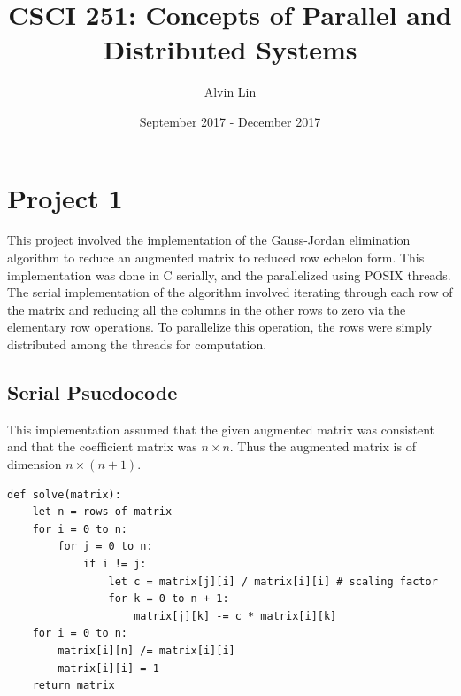 \documentclass{math}
\title{CSCI 251: Concepts of Parallel and Distributed Systems}
\author{Alvin Lin}
\date{September 2017 - December 2017}
\begin{document}
\maketitle

\section*{Project 1}
This project involved the implementation of the Gauss-Jordan elimination
algorithm to reduce an augmented matrix to reduced row echelon form. This
implementation was done in C serially, and the parallelized using POSIX threads.
The serial implementation of the algorithm involved iterating through each
row of the matrix and reducing all the columns in the other rows to zero via
the elementary row operations. To parallelize this operation, the rows were
simply distributed among the threads for computation.

\subsection*{Serial Psuedocode}
This implementation assumed that the given augmented matrix was consistent
and that the coefficient matrix was \( n\times n \). Thus the augmented matrix
is of dimension \( n\times (n+1) \).
\begin{lstlisting}
def solve(matrix):
    let n = rows of matrix
    for i = 0 to n:
        for j = 0 to n:
            if i != j:
                let c = matrix[j][i] / matrix[i][i] # scaling factor
                for k = 0 to n + 1:
                    matrix[j][k] -= c * matrix[i][k]
    for i = 0 to n:
        matrix[i][n] /= matrix[i][i]
        matrix[i][i] = 1
    return matrix
\end{lstlisting}
\end{document}
